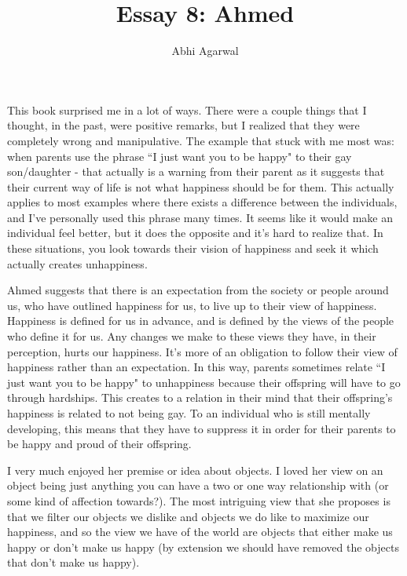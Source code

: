 \documentclass[11pt, oneside]{article}
\title{Essay 8: Ahmed}
\author{Abhi Agarwal}
\date{}
\begin{document}
\maketitle

\par This book surprised me in a lot of ways. There were a couple things that I thought, in the past, were positive remarks, but I realized that they were completely wrong and manipulative. The example that stuck with me most was: when parents use the phrase ``I just want you to be happy" to their gay son/daughter - that actually is a warning from their parent as it suggests that their current way of life is not what happiness should be for them. This actually applies to most examples where there exists a difference between the individuals, and I've personally used this phrase many times. It seems like it would make an individual feel better, but it does the opposite and it's hard to realize that. In these situations, you look towards their vision of happiness and seek it which actually creates unhappiness. 

\par Ahmed suggests that there is an expectation from the society or people around us, who have outlined happiness for us, to live up to their view of happiness. Happiness is defined for us in advance, and is defined by the views of the people who define it for us. Any changes we make to these views they have, in their perception, hurts our happiness. It's more of an obligation to follow their view of happiness rather than an expectation. In this way, parents sometimes relate ``I just want you to be happy" to unhappiness because their offspring will have to go through hardships. This creates to a relation in their mind that their offspring's happiness is related to not being gay. To an individual who is still mentally developing, this means that they have to suppress it in order for their parents to be happy and proud of their offspring.

\par I very much enjoyed her premise or idea about objects. I loved her view on an object being just anything you can have a two or one way relationship with (or some kind of affection towards?). The most intriguing view that she proposes is that we filter our objects we dislike and objects we do like to maximize our happiness, and so the view we have of the world are objects that either make us happy or don't make us happy (by extension we should have removed the objects that don't make us happy). 

\par 
\end{document}
